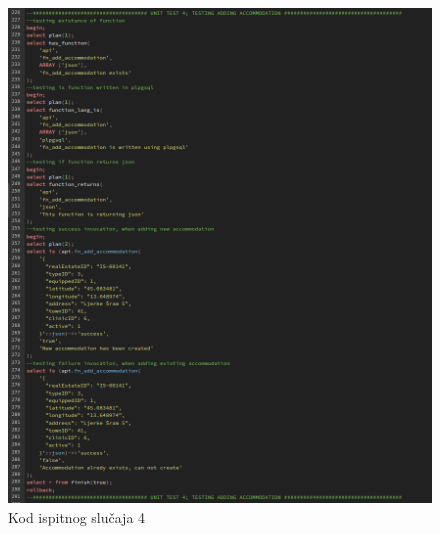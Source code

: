 				\begin{figure}[H]
					\centering
					\includegraphics[width=\textwidth]{slike/unit_tests/ut_4/code.png}
					\caption{Kod ispitnog slučaja 4}
					\label{fig: IS4-kod}
				\end{figure}
				\eject
